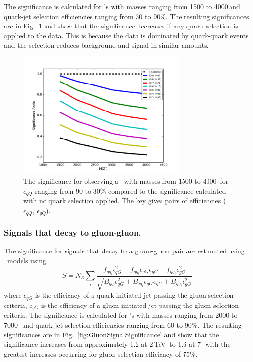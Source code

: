The significance is calculated for \Zprime's with masses ranging from 1500 to 4000\,\GeV and quark-jet selection 
efficiencies ranging from 30 to 90\%. The resulting significances are  in Fig.~\ref{fig:QuarkSignalSignificance}
and show that the significance decreases if any quark-selection is applied to the data. This is because
the data is dominated by quark-quark events and the selection reduces background and signal in similar amounts. 

\begin{figure}[htb]
 \centering
\includegraphics[width=0.75\textwidth]{figures/tagging/QuarkSignalSignificance.png}
\caption{ The significance for observing a \Zprime\ with masses from 1500 to 4000\,\GeV
for $\epsilon_{qQ}$ ranging from 90 to 30\% compared to the significance calculated with no quark selection applied. The key gives pairs of efficiencies ($\epsilon_{qQ}$, $\epsilon_{gQ}$).
  \label{fig:QuarkSignalSignificance}}
\end{figure}

\subsubsection{Signals that decay to gluon-gluon.}

The significance for signals that decay to a gluon-gluon pair are estimated using \Hprime\ models  using 
\begin{equation}
S = N_S \sum_i{ \dfrac{ f_{{qq}_i}\epsilon_{qG}^2 + f_{{qg}_i}\epsilon_{qG}\epsilon_{gG} + f_{{gg}_i}\epsilon_{gG}^2  } {\sqrt{ B_{{qq}_i}\epsilon_{qG}^2 + B_{{qg}_i}\epsilon_{qG}\epsilon_{gG} + B_{{gg}_i}\epsilon_{gG}^2  }}}
\end{equation}
where  
$\epsilon_{qG}$ is the efficiency of a quark initiated jet passing the gluon selection criteria, 
$\epsilon_{gG}$ is the efficiency of a gluon initiated jet passing the gluon selection criteria. 
The significance is calculated for \Hprime's with masses ranging from 2000 to 7000\,\GeV\ and quark-jet selection 
efficiencies ranging from 60 to 90\%. The resulting significances are  in Fig.~\ref{fig:GluonSignalSignificance}
and show that the significance increases from approximately 1.2 at 2\,TeV\ to 1.6 at 7\,\TeV\ with the greatest 
increases  occurring for gluon selection efficiency of 75\%. 

